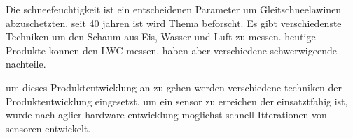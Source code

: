 Die schneefeuchtigkeit ist ein entscheidenen Parameter um Gleitschneelawinen abzuschetzten. seit 40 jahren ist wird Thema beforscht. Es gibt verschiedenste Techniken um den Schaum aus Eis, Wasser und Luft zu messen. heutige Produkte konnen den LWC messen, haben aber verschiedene schwerwigeende nachteile.

um dieses Produktentwicklung an zu gehen werden verschiedene techniken der Produktentwicklung eingesetzt. um ein sensor zu erreichen der einsatztfahig ist, wurde nach aglier hardware entwicklung moglichst schnell Itterationen von sensoren entwickelt.

\fi
